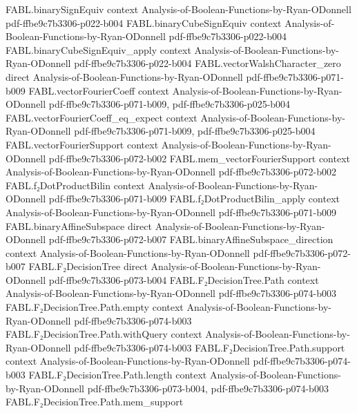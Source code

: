 \begin{theorem}
\proofstep
  {FABL.binarySignEquiv}
  {context}
  {Analysis-of-Boolean-Functions-by-Ryan-ODonnell}
  {pdf-ffbe9c7b3306-p022-b004}
\proofstep
  {FABL.binaryCubeSignEquiv}
  {context}
  {Analysis-of-Boolean-Functions-by-Ryan-ODonnell}
  {pdf-ffbe9c7b3306-p022-b004}
\proofstep
  {FABL.binaryCubeSignEquiv_apply}
  {context}
  {Analysis-of-Boolean-Functions-by-Ryan-ODonnell}
  {pdf-ffbe9c7b3306-p022-b004}
\proofstep
  {FABL.vectorWalshCharacter_zero}
  {direct}
  {Analysis-of-Boolean-Functions-by-Ryan-ODonnell}
  {pdf-ffbe9c7b3306-p071-b009}
\proofstep
  {FABL.vectorFourierCoeff}
  {context}
  {Analysis-of-Boolean-Functions-by-Ryan-ODonnell}
  {pdf-ffbe9c7b3306-p071-b009,
    pdf-ffbe9c7b3306-p025-b004}
\proofstep
  {FABL.vectorFourierCoeff_eq_expect}
  {context}
  {Analysis-of-Boolean-Functions-by-Ryan-ODonnell}
  {pdf-ffbe9c7b3306-p071-b009,
    pdf-ffbe9c7b3306-p025-b004}
\proofstep
  {FABL.vectorFourierSupport}
  {context}
  {Analysis-of-Boolean-Functions-by-Ryan-ODonnell}
  {pdf-ffbe9c7b3306-p072-b002}
\proofstep
  {FABL.mem_vectorFourierSupport}
  {context}
  {Analysis-of-Boolean-Functions-by-Ryan-ODonnell}
  {pdf-ffbe9c7b3306-p072-b002}
\proofstep
  {FABL.f₂DotProductBilin}
  {context}
  {Analysis-of-Boolean-Functions-by-Ryan-ODonnell}
  {pdf-ffbe9c7b3306-p071-b009}
\proofstep
  {FABL.f₂DotProductBilin_apply}
  {context}
  {Analysis-of-Boolean-Functions-by-Ryan-ODonnell}
  {pdf-ffbe9c7b3306-p071-b009}
\proofstep
  {FABL.binaryAffineSubspace}
  {direct}
  {Analysis-of-Boolean-Functions-by-Ryan-ODonnell}
  {pdf-ffbe9c7b3306-p072-b007}
\proofstep
  {FABL.binaryAffineSubspace_direction}
  {context}
  {Analysis-of-Boolean-Functions-by-Ryan-ODonnell}
  {pdf-ffbe9c7b3306-p072-b007}
\proofstep
  {FABL.F₂DecisionTree}
  {direct}
  {Analysis-of-Boolean-Functions-by-Ryan-ODonnell}
  {pdf-ffbe9c7b3306-p073-b004}
\proofstep
  {FABL.F₂DecisionTree.Path}
  {context}
  {Analysis-of-Boolean-Functions-by-Ryan-ODonnell}
  {pdf-ffbe9c7b3306-p074-b003}
\proofstep
  {FABL.F₂DecisionTree.Path.empty}
  {context}
  {Analysis-of-Boolean-Functions-by-Ryan-ODonnell}
  {pdf-ffbe9c7b3306-p074-b003}
\proofstep
  {FABL.F₂DecisionTree.Path.withQuery}
  {context}
  {Analysis-of-Boolean-Functions-by-Ryan-ODonnell}
  {pdf-ffbe9c7b3306-p074-b003}
\proofstep
  {FABL.F₂DecisionTree.Path.support}
  {context}
  {Analysis-of-Boolean-Functions-by-Ryan-ODonnell}
  {pdf-ffbe9c7b3306-p074-b003}
\proofstep
  {FABL.F₂DecisionTree.Path.length}
  {context}
  {Analysis-of-Boolean-Functions-by-Ryan-ODonnell}
  {pdf-ffbe9c7b3306-p073-b004,
    pdf-ffbe9c7b3306-p074-b003}
\proofstep
  {FABL.F₂DecisionTree.Path.mem_support}

\end{theorem}
